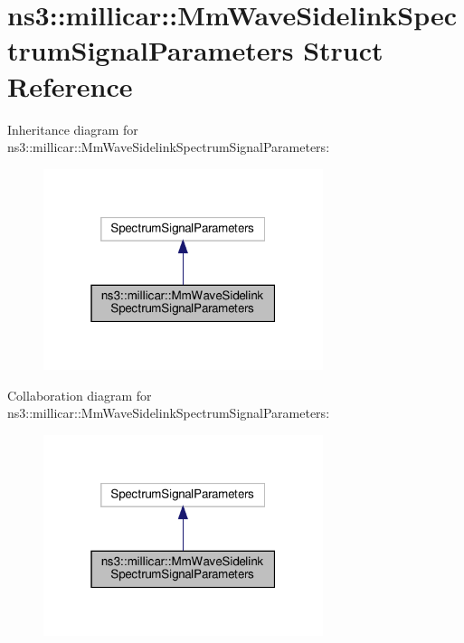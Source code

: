 \hypertarget{structns3_1_1millicar_1_1MmWaveSidelinkSpectrumSignalParameters}{}\section{ns3\+:\+:millicar\+:\+:Mm\+Wave\+Sidelink\+Spectrum\+Signal\+Parameters Struct Reference}
\label{structns3_1_1millicar_1_1MmWaveSidelinkSpectrumSignalParameters}


Inheritance diagram for ns3\+:\+:millicar\+:\+:Mm\+Wave\+Sidelink\+Spectrum\+Signal\+Parameters\+:\nopagebreak
\begin{figure}[H]
\begin{center}
\leavevmode
\includegraphics[width=232pt]{structns3_1_1millicar_1_1MmWaveSidelinkSpectrumSignalParameters__inherit__graph}
\end{center}
\end{figure}


Collaboration diagram for ns3\+:\+:millicar\+:\+:Mm\+Wave\+Sidelink\+Spectrum\+Signal\+Parameters\+:\nopagebreak
\begin{figure}[H]
\begin{center}
\leavevmode
\includegraphics[width=232pt]{structns3_1_1millicar_1_1MmWaveSidelinkSpectrumSignalParameters__coll__graph}
\end{center}
\end{figure}
